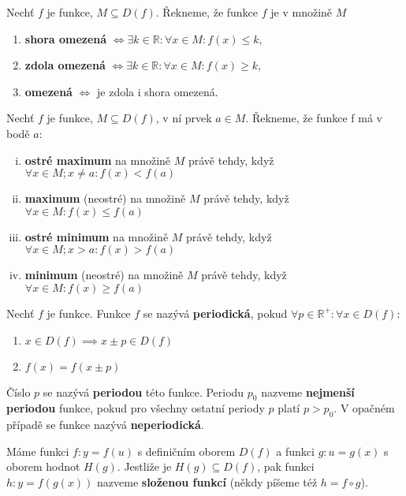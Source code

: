 \begin{definition}
  Nechť $f$ je funkce, $M\subseteq D(f)$. Řekneme, že funkce $f$ je v množině $M$
  \begin{enumerate}[$i.$]
    \item \textbf{shora omezená} $\iff \exists k \in \mathbb R: \forall x \in M: f(x)\leq k,$
    \item \textbf{zdola omezená} $\iff \exists k \in \mathbb R: \forall x \in M: f(x)\geq k,$
    \item \textbf{omezená} $\iff $ je zdola i shora omezená.
  \end{enumerate}
\end{definition}

\begin{definition}
  Nechť $f$ je funkce, $M \subseteq D(f)$, v ní prvek $a \in M$.
  Řekneme, že funkce f má v bodě $a$:
  \begin{enumerate}[i.]
    \item \textbf{ostré maximum} na množině $M$ právě tehdy, když $\forall x \in M; x \not = a: f(x) < f(a)$
    \item \textbf{maximum} (neostré) na množině $M$ právě tehdy, když $\forall x \in M : f(x) \leq f(a)$
    \item \textbf{ostré minimum} na množině $M$ právě tehdy, když $\forall x \in M; x > a: f(x) > f(a)$
    \item \textbf{minimum} (neostré) na množině $M$ právě tehdy, když $\forall x \in M : f(x) \geq f(a)$
  \end{enumerate}
\end{definition}

\begin{definition}
  Nechť $f$ je funkce. Funkce $f$ se nazývá \textbf{periodická}, pokud $\forall p \in \mathbb R^{+}: \forall x \in D(f):$
  \begin{enumerate}
    \item $x \in D(f) \implies x \pm p \in D(f)$
    \item $f(x) = f(x \pm p)$
  \end{enumerate}
  Číslo $p$ se nazývá \textbf{periodou} této funkce. Periodu $p_0$ nazveme \textbf{nejmenší periodou} funkce, pokud pro všechny ostatní periody $p$ platí $p > p_0$. V opačném případě se funkce nazývá \textbf{neperiodická}.
\end{definition}

\begin{definition}
  Máme funkci $f: y = f(u)$ s definičním oborem $D(f)$ a funkci $g: u=g(x)$ s oborem hodnot $H(g)$. Jestliže je $H(g) \subseteq D(f)$, pak funkci $h: y = f(g(x))$ nazveme \textbf{složenou funkcí} (někdy píšeme též $h=f \circ g$).
\end{definition}

